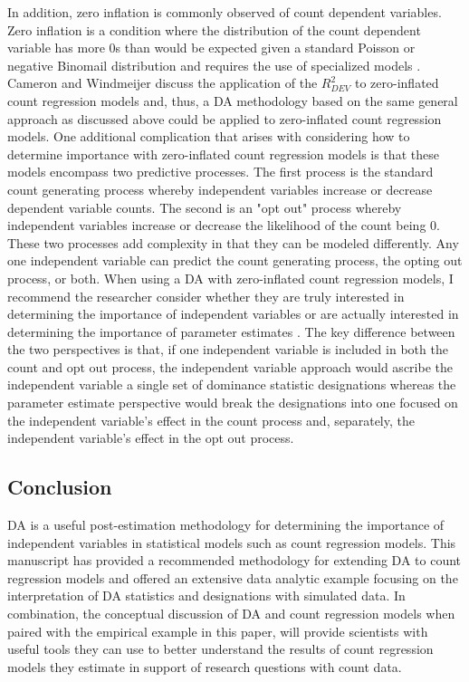 \documentclass[man]{apa7}
\begin{document}
	In addition, zero inflation is commonly observed of count dependent variables.  
	Zero inflation is a condition where the distribution of the count dependent variable has more 0s than would be expected given a standard Poisson or negative Binomail distribution and requires the use of specialized models \parencite[e.g.,][]{blevins2015count, bhaskar2023regression}. 
	Cameron and Windmeijer \parencite*{cameron1996r} discuss the application of the $R^2_{DEV}$ to zero-inflated count regression models and, thus, a DA methodology based on the same general approach as discussed above could be applied to zero-inflated count regression models.
	One additional complication that arises with considering how to determine importance with zero-inflated count regression models is that these models encompass two predictive processes. 
	The first process is the standard count generating process whereby independent variables increase or decrease dependent variable counts.
	The second is an "opt out" process whereby independent variables increase or decrease the likelihood of the count being 0.
	These two processes add complexity in that they can be modeled differently. 
	Any one independent variable can predict the count generating process, the opting out process, or both.
	When using a DA with zero-inflated count regression models, I recommend the researcher consider whether they are truly interested in determining the importance of independent variables or are actually interested in determining the importance of parameter estimates \parencite{luchman2020relative}. 
	The key difference between the two perspectives is that, if one independent variable is included in both the count and opt out process, the independent variable approach would ascribe the independent variable a single set of dominance statistic designations whereas the parameter estimate perspective would break the designations into one focused on the independent variable's effect in the count process and, separately, the independent variable's effect in the opt out process.
	
	\subsection{Conclusion}
	
	DA is a useful post-estimation methodology for determining the importance of independent variables in statistical models such as count regression models.
	This manuscript has provided a recommended methodology for extending DA to count regression models and offered an extensive data analytic example focusing on the interpretation of DA statistics and designations with simulated data.
	In combination, the conceptual discussion of DA and count regression models when paired with the empirical example in this paper, will provide scientists with useful tools they can use to better understand the results of count regression models they estimate in support of research questions with count data.

\printbibliography
	
\end{document}
